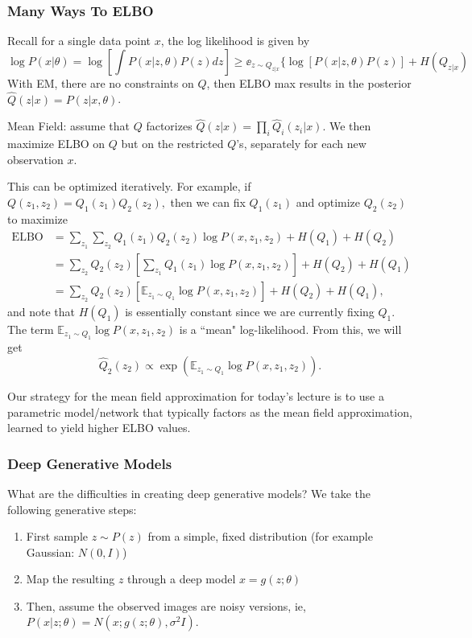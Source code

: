 \documentclass[11pt]{scrartcl}
\begin{document}
\subsubsection{Many Ways To ELBO}
Recall for a single data point $x$, the log likelihood is given by $$\log{P(x|\theta)} = \log\left[\int P(x|z,\theta)P(z)dz\right] \ge \ee_{z \sim Q_{z|x}}\{\log\left[P(x|z,\theta)P(z)\right] + H(Q_{z|x})$$
With EM, there are no constraints on $Q$, then ELBO max results in the posterior $\hat{Q}(z|x) = P(z|x,\theta)$.

Mean Field: assume that $Q$ factorizes $\hat{Q}(z|x) = \prod_{i}\hat{Q}_i(z_i|x)$. We then maximize ELBO on $Q$ but on the restricted $Q$'s, separately for each new observation $x$.

This can be optimized iteratively. For example, if $Q(z_1,z_2) = Q_1(z_1)Q_2(z_2),$ then we can fix $Q_1(z_1)$ and optimize $Q_2(z_2)$ to maximize
\begin{align*}
    \mathrm{ELBO} &= \sum_{z_1}\sum_{z_2} Q_1(z_1)Q_2(z_2)\log P(x,z_1,z_2) + H(Q_1) + H(Q_2)&\\
    &= \sum_{z_2}Q_2(z_2)\left[\sum_{z_1} Q_1(z_1)\log P(x,z_1,z_2)\right] + H(Q_2) + H(Q_1)&\\
    &= \sum_{z_2}Q_2(z_2)\left[\mathbb{E}_{z_1\sim Q_1}\log P(x,z_1,z_2)\right] + H(Q_2) + H(Q_1),&
\end{align*}
and note that $H(Q_1)$ is essentially constant since we are currently fixing $Q_1$. The term $\displaystyle{\mathbb{E}_{z_1\sim Q_1}\log P(x,z_1,z_2)}$ is a ``mean" log-likelihood. From this, we will get
\begin{equation*}
    \widehat{Q}_2(z_2) \propto \exp(\mathbb{E}_{z_1\sim Q_1}\log P(x,z_1,z_2)).
\end{equation*}

Our strategy for the mean field approximation for today's lecture is to use a parametric model/network that typically factors as the mean field approximation, learned to yield higher ELBO values. 

\subsubsection{Deep Generative Models}
What are the difficulties in creating deep generative models? We take the following generative steps:
\begin{enumerate}
    \item First sample $z \sim P(z)$ from a simple, fixed distribution (for example Gaussian: $N(0,I)$)
    \item Map the resulting $z$ through a deep model $x = g(z;\theta)$
    \item Then, assume the observed images are noisy versions, ie, $P(x|z;\theta)= N(x;g(z;\theta),\sigma^2 I)$.
\end{enumerate}
\end{document}
